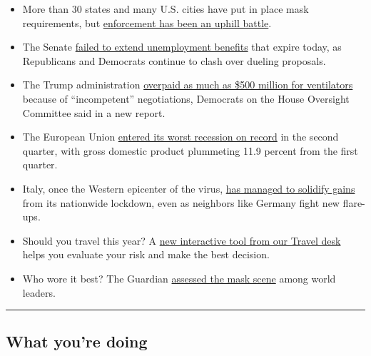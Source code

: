 \begin{itemize}
\item
  More than 30 states and many U.S. cities have put in place mask
  requirements, but
  \href{https://www.nytimes.com/2020/07/31/us/coronavirus-masks-enforcement-key-west.html}{enforcement
  has been an uphill battle}.
\item
  The Senate
  \href{https://www.nytimes.com/2020/07/30/us/politics/senate-virus-aid.html}{failed
  to extend unemployment benefits} that expire today, as Republicans and
  Democrats continue to clash over dueling proposals.
\item
  The Trump administration
  \href{https://www.nytimes.com/2020/07/31/world/coronavirus-covid-19.html\#link-3a85f957}{overpaid
  as much as \$500 million for ventilators} because of ``incompetent''
  negotiations, Democrats on the House Oversight Committee said in a new
  report.
\item
  The European Union
  \href{https://www.nytimes.com/live/2020/07/31/business/stock-market-today-coronavirus\#europes-contraction-is-its-worst-on-record}{entered
  its worst recession on record} in the second quarter, with gross
  domestic product plummeting 11.9 percent from the first quarter.
\item
  Italy, once the Western epicenter of the virus,
  \href{https://www.nytimes.com/2020/07/31/world/europe/italy-coronavirus-reopening.html}{has
  managed to solidify gains} from its nationwide lockdown, even as
  neighbors like Germany fight new flare-ups.
\item
  Should you travel this year? A
  \href{https://www.nytimes.com/interactive/2020/07/31/travel/coronavirus-travel-risk.html}{new
  interactive tool from our Travel desk} helps you evaluate your risk
  and make the best decision.
\item
  Who wore it best? The Guardian
  \href{https://www.theguardian.com/world/2020/jul/31/politicians-face-masks-winners-and-losers-in-pictures-coronavirus}{assessed
  the mask scene} among world leaders.
\end{itemize}

\begin{center}\rule{0.5\linewidth}{\linethickness}\end{center}

\hypertarget{what-youre-doing}{%
\subsection{What you're doing}\label{what-youre-doing}}

